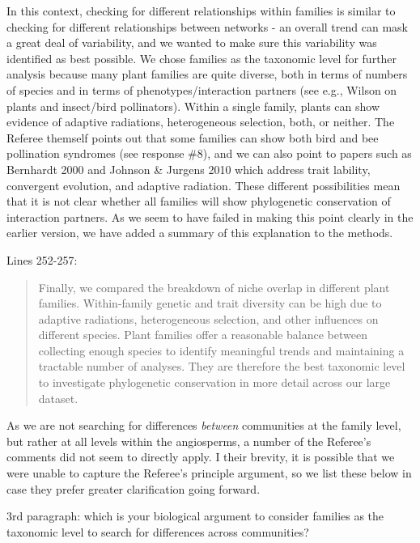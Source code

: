 \documentclass[12pt]{letter}
\newenvironment{refquote}{\bigskip \begin{it}}{\end{it}\smallskip}
\begin{document}
		In this context, checking for different relationships within families is similar to checking for different relationships between networks - an overall trend can mask a great deal of variability, and we wanted to make sure this variability was identified as best possible. We chose families as the taxonomic level for further analysis because many plant families are quite diverse, both in terms of numbers of species and in terms of phenotypes/interaction partners (see e.g., Wilson on plants and insect/bird pollinators). Within a single family, plants can show evidence of adaptive radiations, heterogeneous selection, both, or neither. The Referee themself points out that some families can show both bird and bee pollination syndromes (see response \#8), and we can also point to papers such as Bernhardt 2000 and Johnson \& Jurgens 2010 which address trait lability, convergent evolution, and adaptive radiation. These different possibilities mean that it is not clear whether all families will show phylogenetic conservation of interaction partners. 
		As we seem to have failed in making this point clearly in the earlier version, we have added a summary of this explanation to the methods. 


		Lines 252-257:

		\begin{quotation}

			Finally, we compared the breakdown of niche overlap in different plant families.
		    Within-family genetic and trait diversity can be high due to adaptive radiations, heterogeneous selection, and other influences on different species. 
		    Plant families offer a reasonable balance between collecting enough species to identify meaningful trends and maintaining a tractable number of analyses. 
		    They are therefore the best taxonomic level to investigate phylogenetic conservation in more detail across our large dataset.

		\end{quotation}


		As we are not searching for differences \emph{between} communities at the family level, but rather at all levels within the angiosperms, a number of the Referee's comments did not seem to directly apply. I their brevity, it is possible that we were unable to capture the Referee's principle argument, so we list these below in case they prefer greater clarification going forward. 


		\begin{refquote}
		3rd paragraph:  which is your biological argument to consider families as the taxonomic level to search for differences across communities?
		\end{refquote}
\end{document}
